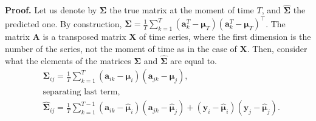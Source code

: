 \documentclass[12pt]{article}
\begin{document}
\textbf{Proof.} Let us denote by $\mathbf{\Sigma}$ the true matrix at the moment of time $T$, and $\hat{\mathbf{\Sigma}}$ the predicted one. By construction, ${\mathbf{\Sigma}} = \frac{1}{T} \sum_{k=1}^{T} (\mathbf{a}^T_k - \boldsymbol{\mu}_T)(\mathbf{a}^T_k - \boldsymbol{\mu}_T)^\intercal\texttt{}$. The matrix $\mathbf{A}$ is a transposed matrix $\mathbf{X}$ of time series, where the first dimension is the number of the series, not the moment of time as in the case of $\mathbf{X}$. Then, consider what the elements of the matrices $\mathbf{\Sigma}$ and $\hat{\mathbf{\Sigma}}$ are equal to.
\begin{align*}
	&\mathbf{\Sigma}_{ij} = \frac{1}{T}\sum_{k=1}^{T}(\mathbf{a}_{ik} - \boldsymbol{\mu}_i)(\mathbf{a}_{jk}-\boldsymbol{\mu}_j),\\
    &\text{separating last term,}\\
	&\hat{\mathbf{\Sigma}}_{ij} = \frac{1}{T}\sum_{k=1}^{T-1}(\mathbf{a}_{ik} - \hat{\boldsymbol{\mu}}_i)(\mathbf{a}_{jk}-\hat{\boldsymbol{\mu}}_j) + (\mathbf{y}_i - \hat{\boldsymbol{\mu}}_i)(\mathbf{y}_j - \hat{\boldsymbol{\mu}}_j).
\end{align*}
\end{document}
